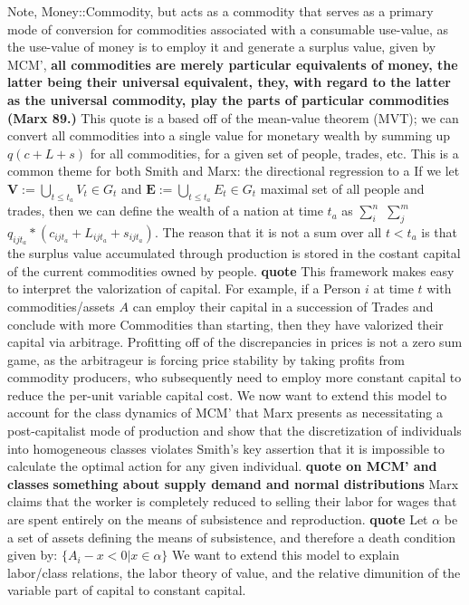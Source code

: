 \documentclass[12pt]{article}
\begin{document}
Note, Money::Commodity, but acts as a commodity that serves as a primary mode of conversion for commodities associated with a consumable use-value, as the use-value of money is to employ it and generate a surplus value, given by MCM', \textbf{all commodities are merely particular equivalents of money, the latter being their universal equivalent, they, with regard to the latter as the universal commodity, play the parts of particular commodities (Marx 89.)}
This quote is a based off of the mean-value theorem (MVT); we can convert all commodities into a single value for monetary wealth by summing up $q(c+L+s)$ for all commodities, for a given set of people, trades, etc. This is a common theme for both Smith and Marx: the directional regression to a 
If we let $\boldsymbol{V} :=\bigcup\limits_{t \leq t_a} V_t \in G_t$ and $\boldsymbol{E} :=\bigcup\limits_{t \leq t_a} E_t \in G_t$ maximal set of all people and trades, then we can define the wealth of a nation at time $t_a$ as $\sum\limits_i^n$ $\sum\limits_j^m$ $q_{ijt_{a}} * (c_{ijt_{a}} + L_{ijt_{a}} + s_{ijt_{a}})$. 
The reason that it is not a sum over all $t < t_a$ is that the surplus value accumulated through production is stored in the costant capital of the current commodities owned by people. \textbf{quote}
This framework makes easy to interpret the valorization of capital.
For example, if a Person $i$ at time $t$ with commodities/assets $A$ can employ their capital in a succession of Trades and conclude with more Commodities than starting, then they have valorized their capital via arbitrage.
 Profitting off of the discrepancies in prices is not a zero sum game, as the arbitrageur is forcing price stability by taking profits from commodity producers, who subsequently need to employ more constant capital to reduce the per-unit variable capital cost.
We now want to extend this model to account for the class dynamics of MCM' that Marx presents as necessitating a post-capitalist mode of production and show that the discretization of individuals into homogeneous classes violates Smith's key assertion that it is impossible to calculate the optimal action for any given individual. 
\textbf{quote on MCM' and classes}
\textbf{something about supply demand and normal distributions}
Marx claims that the worker is completely reduced to selling their labor for wages that are spent entirely on the means of subsistence and reproduction. \textbf{quote}
Let $\alpha$ be a set of assets defining the means of subsistence, and therefore a death condition given by: $\{A_i - x < 0| x \in \alpha \}$  
We want to extend this model to explain labor/class relations, the labor theory of value, and the relative dimunition of the variable part of capital to constant capital.
\end{document}
